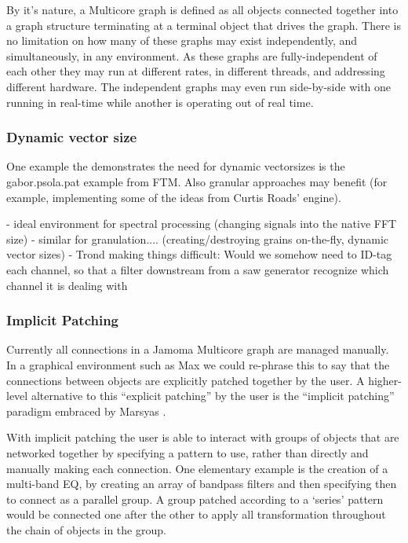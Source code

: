 \documentclass[twoside,a4paper]{article}
\begin{document}
By it's nature, a Multicore graph is defined as all objects connected together into a graph structure terminating at a terminal object that drives the graph.  
There is no limitation on how many of these graphs may exist independently, and simultaneously, in any environment.  
As these graphs are fully-independent of each other they may run at different rates, in different threads, and addressing different hardware.  The independent graphs may even run side-by-side with one running in real-time while another is operating out of real time.



\subsubsection{Dynamic vector size} %


One example the demonstrates the need for dynamic vectorsizes is the gabor.psola.pat example from FTM. 
Also granular approaches may benefit (for example, implementing some of the ideas from Curtis Roads' engine).

- ideal environment for spectral processing (changing signals into the native FFT size)
- similar for granulation.... (creating/destroying grains on-the-fly, dynamic vector sizes)
- Trond making things difficult: Would we somehow need to ID-tag each channel, so that a filter downstream from a saw generator recognize which channel it is dealing with




\subsubsection{Implicit Patching} %

Currently all connections in a Jamoma Multicore graph are managed manually.  In a graphical environment such as Max we could re-phrase this to say that the connections between objects are explicitly patched together by the user.  A higher-level alternative to this ``explicit patching'' by the user is the ``implicit patching'' paradigm embraced by Marsyas \cite{Bray:2005}.

With implicit patching the user is able to interact with groups of objects that are networked together by specifying a pattern to use, rather than directly and manually making each connection.  One elementary example is the creation of a multi-band EQ, by creating an array of bandpass filters and then specifying then to connect as a parallel group.  A group patched according to a `series' pattern would be connected one after the other to apply all transformation throughout the chain of objects in the group.
\end{document}

